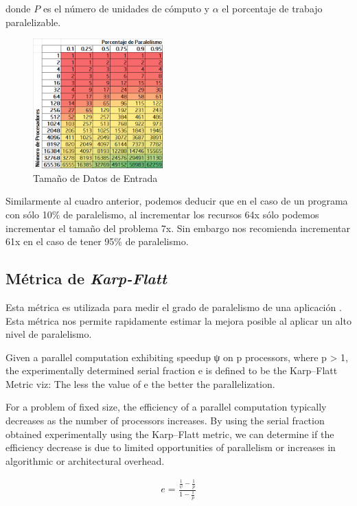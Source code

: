 \documentclass[a4paper]{report}
\begin{document}
donde $ P $ es el n\'umero de unidades de c\'omputo y $ \alpha $ el porcentaje de trabajo paralelizable.

\begin{figure}[H]
\begin{center}
\includegraphics[width=5cm]{gustafson.png}
\caption{Tama\~no de Datos de Entrada}
\end{center}
\end{figure}

Similarmente al cuadro anterior, podemos deducir que en el caso de un programa con s\'olo 10\% de paralelismo, al incrementar los recursos 64x s\'olo podemos incrementar el tama\~no del problema 7x. Sin embargo nos recomienda incrementar 61x en el caso de tener 95\% de paralelismo.

\subsection{M\'etrica de {\it Karp-Flatt}}

Esta m\'etrica es utilizada para medir el grado de paralelismo de una aplicaci\'on \cite{karp-flatt}.
Esta m\'etrica nos permite rapidamente estimar la mejora posible al aplicar un alto nivel de paralelismo.

\bigskip

Given a parallel computation exhibiting speedup ψ on p processors, where p > 1, the experimentally determined serial fraction e is defined to be the Karp–Flatt Metric viz: The less the value of e the better the parallelization.

For a problem of fixed size, the efficiency of a parallel computation typically decreases as the number of processors increases. By using the serial fraction obtained experimentally using the Karp–Flatt metric, we can determine if the efficiency decrease is due to limited opportunities of parallelism or increases in algorithmic or architectural overhead.

\begin{eqnarray}
 e = \frac{\frac{1}{\psi} - \frac{1}{p}}{1 - \frac{1}{p}} 
\end{eqnarray}
\end{document}
